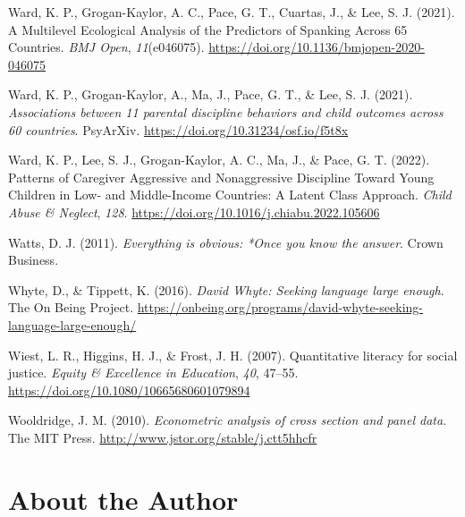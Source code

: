 \documentclass[
  letterpaper,
  DIV=11,
  numbers=noendperiod]{scrreprt}
\newlength{\cslhangindent}
\newlength{\cslentryspacingunit} %
\newenvironment{CSLReferences}[2] %
 {%
  \setlength{\parindent}{0pt}
  \ifodd #1
  \let\oldpar\par
  \def\par{\hangindent=\cslhangindent\oldpar}
  \fi
  \setlength{\parskip}{#2\cslentryspacingunit}
 }%
 {}
\begin{document}
\begin{CSLReferences}{1}{0}
\leavevmode{}%
Ward, K. P., Grogan-Kaylor, A. C., Pace, G. T., Cuartas, J., \& Lee, S.
J. (2021). {A Multilevel Ecological Analysis of the Predictors of
Spanking Across 65 Countries}. \emph{BMJ Open}, \emph{11}(e046075).
\url{https://doi.org/10.1136/bmjopen-2020-046075}

\leavevmode{}%
Ward, K. P., Grogan-Kaylor, A., Ma, J., Pace, G. T., \& Lee, S. J.
(2021). \emph{Associations between 11 parental discipline behaviors and
child outcomes across 60 countries}. PsyArXiv.
\url{https://doi.org/10.31234/osf.io/f5t8x}

\leavevmode{}%
Ward, K. P., Lee, S. J., Grogan-Kaylor, A. C., Ma, J., \& Pace, G. T.
(2022). {Patterns of Caregiver Aggressive and Nonaggressive Discipline
Toward Young Children in Low- and Middle-Income Countries: A Latent
Class Approach}. \emph{Child Abuse \& Neglect}, \emph{128}.
\url{https://doi.org/10.1016/j.chiabu.2022.105606}

\leavevmode{}%
Watts, D. J. (2011). \emph{Everything is obvious: *Once you know the
answer}. Crown Business.

\leavevmode{}%
Whyte, D., \& Tippett, K. (2016). \emph{{D}avid {W}hyte: Seeking
language large enough}. The On Being Project.
\url{https://onbeing.org/programs/david-whyte-seeking-language-large-enough/}

\leavevmode{}%
Wiest, L. R., Higgins, H. J., \& Frost, J. H. (2007). Quantitative
literacy for social justice. \emph{Equity \& Excellence in Education},
\emph{40}, 47--55. \url{https://doi.org/10.1080/10665680601079894}

\leavevmode{}%
Wooldridge, J. M. (2010). \emph{Econometric analysis of cross section
and panel data}. The MIT Press.
\url{http://www.jstor.org/stable/j.ctt5hhcfr}

\end{CSLReferences}


\hypertarget{about-the-author}{%
\chapter{About the Author}\label{about-the-author}}
\end{document}
